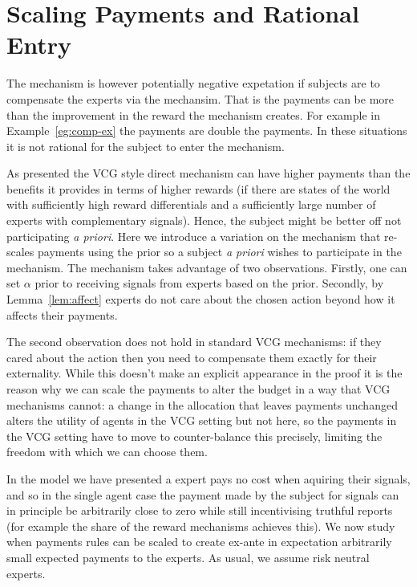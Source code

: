 \section{Scaling Payments and Rational Entry}

The mechanism is however potentially negative expetation if subjects are to compensate the experts via the mechansim.  That is the payments can be more than the improvement in the reward the mechanism creates. For example in Example~\ref{eg:comp-ex} the payments are double the payments. In these situations it is not rational for the subject to enter the mechanism.


As presented the VCG style direct mechanism can have higher payments than the benefits it provides in terms of higher rewards (if there are states of the world with sufficiently high reward differentials and a sufficiently large number of experts with complementary signals). Hence, the subject might be better off not participating \emph{a priori}. Here we introduce a variation on the mechanism that re-scales payments using the prior so a subject \emph{a priori} wishes to participate in the mechanism. The mechanism takes advantage of two observations. Firstly, one can set $\alpha$ prior to receiving signals from experts based on the prior. Secondly, by Lemma~\ref{lem:affect} experts do not care about the chosen action beyond how it affects their payments. 

The second observation does not hold in standard VCG mechanisms: if they cared about the action then you need to compensate them exactly for their externality. While this doesn't make an explicit appearance in the proof it is the reason why we can scale the payments to alter the budget in a way that VCG mechanisms cannot: a change in the allocation that leaves payments unchanged alters the utility of agents in the VCG setting but not here, so the payments in the VCG setting have to move to counter-balance this precisely, limiting the freedom with which we can choose them.


In the model we have presented a expert pays no cost when aquiring their signals, and so in the single agent case the payment made by the subject for signals can in principle be arbitrarily close to zero while still incentivising truthful reports (for example the share of the reward mechanisms achieves this). We now study when payments rules can be scaled to create ex-ante in expectation arbitrarily small expected payments to the experts. As usual, we assume risk neutral experts. 


